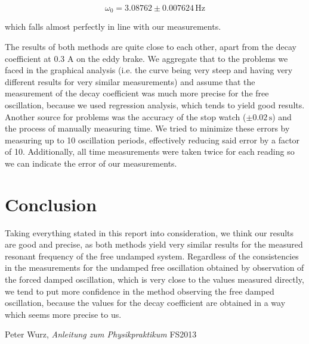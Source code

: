 \documentclass{scrreprt}
\newcommand{\unit}[1]{\ensuremath{\, \mathrm{#1}}}
\begin{document}
\[\omega_0 = 3.08762 \pm 0.007624 \unit{Hz}\]

which falls almost perfectly in line with our measurements.

The results of both methods are quite close to each other, apart from the decay coefficient at 0.3 A on the eddy brake. We aggregate that to the problems we faced in the graphical analysis (i.e. the curve being very steep and having very different results for very similar measurements) and assume that the measurement of the decay coefficient was much more precise for the free oscillation, because we used regression analysis, which tends to yield good results.\\
Another source for problems was the accuracy of the stop watch ($\pm 0.02 \unit{s}$) and the process of manually measuring time. We tried to minimize these errors by measuring up to 10 oscillation periods, effectively reducing said error by a factor of 10. Additionally, all time measurements were taken twice for each reading so we can indicate the error of our measurements.  

\section{Conclusion}

Taking everything stated in this report into consideration, we think our results are good and precise, as both methods yield very similar results for the measured resonant frequency of the free undamped system. Regardless of the consistencies in the measurements for the undamped free oscillation obtained by observation of the forced damped oscillation, which is very close to the values measured directly, we tend to put more confidence in the method observing the free damped oscillation, because the values for the decay coefficient are obtained in a way which seems more precise to us.


\begin{thebibliography}{9}

  Peter Wurz,
  \emph{Anleitung zum Physikpraktikum}
  FS2013

\end{thebibliography}
\end{document}

